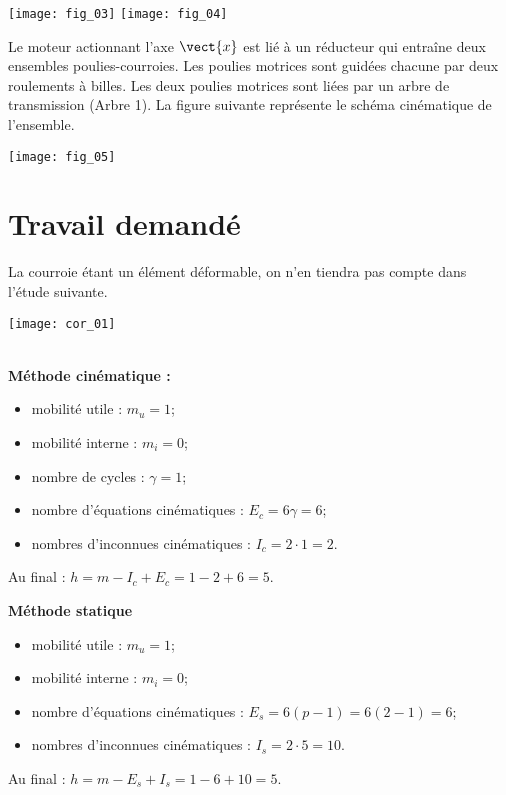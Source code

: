 \begin{marginfigure}
\texttt{[image: fig\_03]}
\texttt{[image: fig\_04]}
\end{marginfigure}

Le moteur actionnant l’axe $\vect{x}$ est lié à un réducteur qui entraîne deux ensembles poulies-courroies. Les poulies motrices sont guidées chacune par deux roulements à billes. Les deux poulies motrices sont liées par un arbre de transmission (Arbre 1). La
figure suivante représente le schéma cinématique de l’ensemble.

\begin{marginfigure}
\texttt{[image: fig\_05]}
\end{marginfigure}
\fi


\section*{Travail demandé}

\ifprof
\else
La courroie étant un élément déformable, on n’en tiendra pas compte dans l’étude suivante.
\fi

\ifprof
\begin{marginfigure}
\texttt{[image: cor\_01]}
\end{marginfigure}

\begin{corrige} ~\\



\textbf{Méthode cinématique :}
\begin{itemize}
\item mobilité utile : $m_u=1$;
\item mobilité interne : $m_i=0$;
\item nombre de cycles : $\gamma = 1$;
\item nombre d'équations cinématiques : $E_c=6\gamma = 6$;
\item nombres d'inconnues cinématiques : $I_c=2\cdot 1=2$.
\end{itemize}
Au final : $h=m-I_c+E_c=1-2+6=5$.

\textbf{Méthode statique}
\begin{itemize}
\item mobilité utile : $m_u=1$;
\item mobilité interne : $m_i=0$;
\item nombre d'équations cinématiques : $E_s=6(p-1)=6(2-1)= 6$;
\item nombres d'inconnues cinématiques : $I_s=2\cdot 5 = 10$.
\end{itemize}
Au final : $h=m-E_s+I_s=1-6+10=5$.

\end{corrige}
\else
\fi

